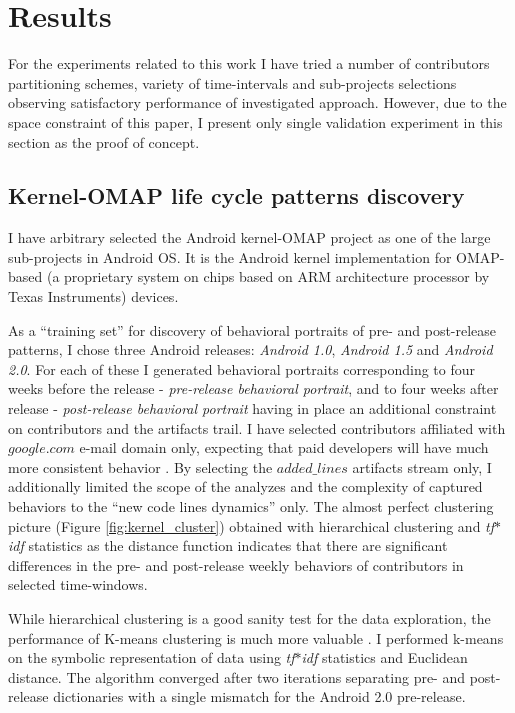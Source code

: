 \documentclass[conference]{worldcomp}
\begin{document}
\section{Results}
For the experiments related to this work I have tried a number of contributors 
partitioning schemes, variety of time-intervals and sub-projects selections observing
satisfactory performance of investigated approach. However, due to the space constraint 
of this paper, I present only single validation experiment in this section 
as the proof of concept.

\subsection{Kernel-OMAP life cycle patterns discovery}
I have arbitrary selected the Android kernel-OMAP project as one of the large sub-projects in Android OS. 
It is the Android kernel implementation for OMAP-based (a proprietary system on chips based on 
ARM architecture processor by Texas Instruments) devices.

As a ``training set'' for discovery of behavioral portraits of pre- and post-release patterns, 
I chose three Android releases: \textit{Android 1.0}, \textit{Android 1.5} and \textit{Android 2.0}. 
For each of these I generated behavioral portraits corresponding to four weeks before the 
release - \textit{pre-release behavioral portrait}, 
and to four weeks after release - \textit{post-release behavioral portrait}
having in place an additional constraint on contributors and the artifacts trail. 
I have selected contributors affiliated with $google.com$ e-mail domain only, expecting
that paid developers will have much more consistent behavior \cite{citeulike:10392277}.
By selecting the $added\_lines$ artifacts stream only, I additionally limited the scope of the
analyzes and the complexity of captured behaviors to the ``new code lines dynamics'' only.
The almost perfect clustering picture (Figure \ref{fig:kernel_cluster}) 
obtained with hierarchical clustering and \textit{tf$\ast$idf} statistics as the distance function 
indicates that there are significant differences in the pre- and post-release weekly behaviors
 of contributors in selected time-windows.

While hierarchical clustering is a good sanity test for the data exploration, the performance of K-means 
clustering is much more valuable \cite{citeulike:3562}. I performed k-means on the symbolic 
representation of data using \textit{tf$\ast$idf} statistics and Euclidean distance. The algorithm converged after two
iterations separating pre- and post-release dictionaries with a single mismatch for the Android 2.0 pre-release.
\end{document}
